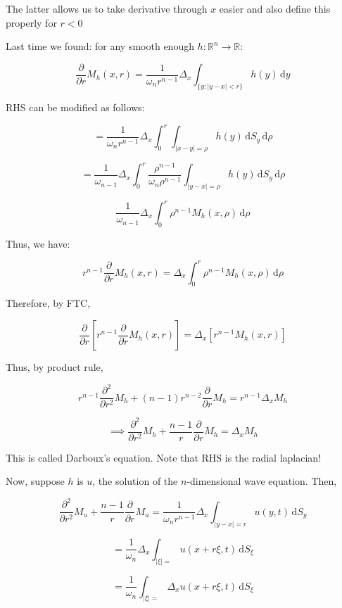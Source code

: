 \documentclass{article}
\theoremstyle{definition}
\begin{document}
The latter allows us to take derivative through \(x\) easier and also define this properly for \(r < 0\) 

Last time we found: for any smooth enough \(h:\mathbb{R}^n\to\mathbb{R}\):

\[
    \frac{\partial}{\partial r} M_h(x,r) = \frac{1}{\omega_n r^{n-1}} \Delta_x \int_{\{ y : \vert y - x \vert < r \} }^{} h(y) \,\mathrm{d}y 
\]

RHS can be modified as follows:

\[
    = \frac{1}{\omega _{n}r^{n-1} }\Delta_x \int_{0}^{r} \int_{\vert x - y \vert = \rho }^{} h(y) \,\mathrm{d}S_{y}   \,\mathrm{d}\rho  
\]

\[
    = \frac{1}{\omega_{n-1}} \Delta _x \int_{0}^{r} \frac{\rho^{n-1}}{\omega_n \rho^{n-1}} \int_{\vert y - x \vert = \rho }^{} h(y) \,\mathrm{d}S_y \,\mathrm{d}\rho 
\]

\[
    \frac{1}{\omega_{n-1}}\Delta _x \int_{0}^{r} \rho ^{n-1} M_h(x,\rho) \,\mathrm{d}\rho  
\]

Thus, we have:

\[
    r^{n-1} \frac{\partial}{\partial r} M_h(x,r) = \Delta_x \int_{0}^{r} \rho ^{n-1} M_h(x,\rho ) \,\mathrm{d}\rho  
\]

Therefore, by FTC,

\[
    \frac{\partial}{\partial r} \left[ r^{n-1} \frac{\partial}{\partial r} M_h(x,r) \right] = \Delta _x \left[ r^{n-1} M_h(x,r) \right] 
\]

Thus, by product rule,

\[
    r^{n-1} \frac{\partial^2}{\partial r^2} M_h + (n-1) r^{n-2} \frac{\partial}{\partial r} M_h = r^{n-1} \Delta _x M_h
\]

\[
    \implies \frac{\partial^2}{\partial r^2} M_h + \frac{n-1}{r} \frac{\partial}{\partial r} M_h = \Delta_x M_h
\]

This is called Darboux's equation. Note that RHS is the radial laplacian!

Now, suppose \(h\) is \(u\), the solution of the \(n\)-dimensional wave equation. Then,

\[
    \frac{\partial^2}{\partial r^2} M_u + \frac{n-1}{r} \frac{\partial}{\partial r} M_u = \frac{1}{\omega_n r^{n-1} } \Delta_x \int_{\vert y - x \vert = r}^{} u(y,t) \,\mathrm{d}S_y 
\]

\[
    = \frac{1}{\omega_n} \Delta_x \int_{\vert \xi  \vert =}^{} u(x+r\xi,t) \,\mathrm{d}S_\xi 
\]

\[
    = \frac{1}{\omega_n} \int_{\vert \xi  \vert =}^{} \Delta_x u(x+r\xi,t) \,\mathrm{d}S_\xi 
\]
\end{document}
